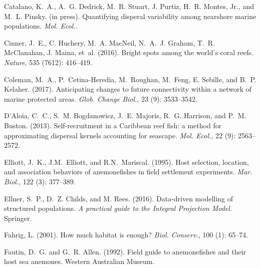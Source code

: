 \documentclass[12pt, oneside]{article}   	%
\begin{document}
\begin{thebibliography}{66}
Catalano, K.~A., A.~G. Dedrick, M.~R. Stuart, J. Purtiz,
  H.~R. Montes, Jr., and M.~L. Pinsky. (in press).
\newblock Quantifying disperal variability among nearshore marine populations.
\newblock \emph{Mol. Ecol.}.

Cinner, J.~E., C. Huchery, M.~A. MacNeil, N.~A.~J. Graham, T.~R.
  McClanahan, J. Maina, et~al. (2016).
\newblock Bright spots among the world’s coral reefs.
\newblock \emph{Nature}, 535 (7612): 416--419.

Coleman, M.~A., P.~Cetina-Heredia, M.~Roughan, M.~Feng, E. Sebille, and B.~P. Kelaher. (2017).
\newblock Anticipating changes to future connectivity within a network of
  marine protected areas.
\newblock \emph{Glob. Change Biol.}, 23 (9): 3533--3542.

D'Aloia, C.~C., S.~M. Bogdanowicz, J.~E. Majoris, R.~G. Harrison, and P.~M.
  Buston. (2013).
\newblock Self-recruitment in a Caribbean reef fish: a method for
  approximating dispersal kernels accounting for seascape.
\newblock \emph{Mol. Ecol.}, 22 (9): 2563--2572.

Elliott, J.~K., J.M.~Elliott, and R.N.~Mariscal. (1995).
\newblock Host selection, location, and association behaviors of anemonefishes
  in field settlement experiments.
\newblock \emph{Mar. Biol.}, 122 (3): 377--389.

Ellner, S.~P., D.~Z. Childs, and M. Rees. (2016).
\newblock Data-driven modelling of structured populations.
\newblock \emph{A practical guide to the Integral Projection Model}. Springer.

Fahrig, L. (2001).
\newblock How much habitat is enough?
\newblock \emph{Biol. Conserv.}, 100 (1): 65--74.

Fautin, D.~G. and G.~R. Allen. (1992).
\newblock Field guide to anemonefishes and their host sea anemones.
\newblock Western Australian Museum.


\end{thebibliography}
\end{document}
